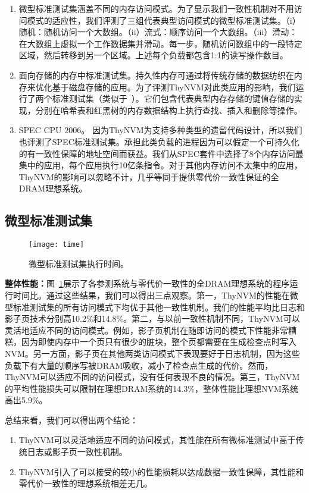 \begin{enumerate}
\item 微型标准测试集涵盖不同的内存访问模式。为了显示我们一致性机制对不用访问模式的适应性，我们评测了三组代表典型访问模式的微型标准测试集。（i）随机：随机访问一个大数组。（ii）流式：顺序访问一个大数组。（iii）滑动：在大数组上虚拟一个工作数据集并滑动。每一步，随机访问数组中的一段特定区域，然后转移到另一个区域。上述每个负载都包含1:1的读写操作数目。
\item 面向存储的内存中标准测试集。持久性内存可通过将传统存储的数据纺织在内存来优化基于磁盘存储的应用。为了评测ThyNVM对此类应用的影响，我们运行了两个标准测试集（类似于~\cite{Coburn:2011:NMP:1950365.1950380, Zhao:2013:KCP:2540708.2540744}）。它们包含代表典型内存存储的键值存储的实现，分别在哈希表和红黑树的内存数据结构上执行查找、插入和删除等操作。 
\item SPEC CPU 2006。 因为ThyNVM为支持多种类型的遗留代码设计，所以我们也评测了SPEC标准测试集。承担此类负载的进程因为可以假定一个可持久化的有一致性保障的地址空间而获益。我们从SPEC套件中选择了8个内存访问最集中的应用，每个应用执行10亿条指令。对于其他内存访问不太集中的应用，ThyNVM的影响可以忽略不计，几乎等同于提供零代价一致性保证的全DRAM理想系统。 
\end{enumerate}

\subsection{微型标准测试集}

\begin{figure}[!h]
  \centering
  \texttt{[image: time]}
  \caption{微型标准测试集执行时间。}
  \label{fig:micro-time}
\end{figure}

\textbf{整体性能：}图~\ref{fig:micro-time}展示了各参测系统与零代价一致性的全DRAM理想系统的程序运行时间比。通过这些结果，我们可以得出三点观察。第一，ThyNVM的性能在微型标准测试集的所有访问模式下均优于其他一致性机制。我们的性能平均比日志和影子页技术分别高10.2\%和14.8\%。第二，与以前一致性机制不同，ThyNVM可以灵活地适应不同的访问模式。例如，影子页机制在随即访问的模式下性能非常糟糕，因为即使内存中一个页只有很少的脏块，整个页都需要在生成检查点时写入NVM。另一方面，影子页在其他两类访问模式下表现要好于日志机制，因为这些负载下有大量的顺序写被DRAM吸收，减小了检查点生成的代价。然而，ThyNVM可以适应不同的访问模式，没有任何表现不良的情况。第三，ThyNVM的平均性能损失可以限制在理想DRAM系统的14.3\%，整体性能比理想NVM系统高出5.9\%。

总结来看，我们可以得出两个结论：
\begin{enumerate}
\item ThyNVM可以灵活地适应不同的访问模式，其性能在所有微标准测试中高于传统日志或影子页一致性机制。 
\item ThyNVM引入了可以接受的较小的性能损耗以达成数据一致性保障，其性能和零代价一致性的理想系统相差无几。
\end{enumerate}

